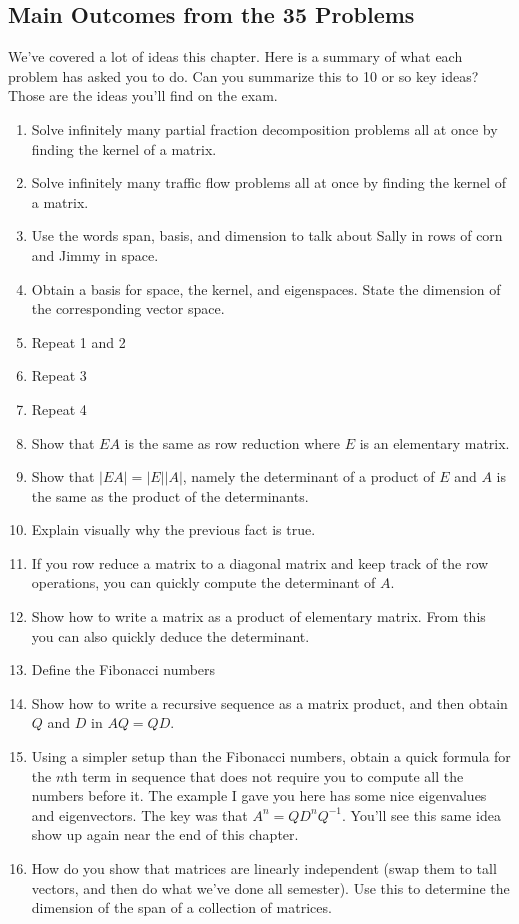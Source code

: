 \documentclass[letterpaper,oneside]{book}%
\theoremstyle{plain}
\theoremstyle{box}
\theoremstyle{problem}
\begin{document}
\subsection*{Main Outcomes from the 35 Problems}
We've covered a lot of ideas this chapter.  Here is a summary of what each problem has asked you to do.  Can you summarize this to 10 or so key ideas?  Those are the ideas you'll find on the exam.
\begin{enumerate}
 \item Solve infinitely many partial fraction decomposition problems all at once by finding the kernel of a matrix.
 \item Solve infinitely many traffic flow problems all at once by finding the kernel of a matrix.
 \item Use the words span, basis, and dimension to talk about Sally in rows of corn and Jimmy in space.
 \item Obtain a basis for space, the kernel, and eigenspaces.  State the dimension of the corresponding vector space.
 \item Repeat 1 and 2
 \item Repeat 3
 \item Repeat 4
 \item Show that $EA$ is the same as row reduction where $E$ is an elementary matrix.
 \item Show that $|EA| = |E||A|$, namely the determinant of a product of $E$ and $A$ is the same as the product of the determinants.
 \item Explain visually why the previous fact is true.
 \item If you row reduce a matrix to a diagonal matrix and keep track of the row operations, you can quickly compute the determinant of $A$. 
 \item Show how to write a matrix as a product of elementary matrix. From this you can also quickly deduce the determinant.
 \item Define the Fibonacci numbers
 \item Show how to write a recursive sequence as a matrix product, and then obtain $Q$ and $D$ in $AQ=QD$. 
 \item Using a simpler setup than the Fibonacci numbers, obtain a quick formula for the $n$th term in sequence that does not require you to compute all the numbers before it. The example I gave you here has some nice eigenvalues and eigenvectors. The key was that $A^n=QD^nQ^{-1}$.  You'll see this same idea show up again near the end of this chapter.
 \item How do you show that matrices are linearly independent (swap them to tall vectors, and then do what we've done all semester). Use this to determine the dimension of the span of a collection of matrices.

\end{enumerate}
\end{document}

